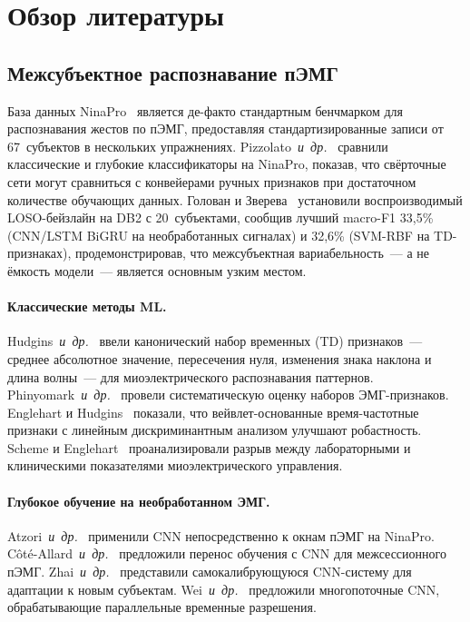 \documentclass[conference]{IEEEtran}
\newcommand{\etal}{\mbox{\textit{и~др.}}}
\begin{document}
\section{Обзор литературы}
\label{sec:related}

\subsection{Межсубъектное распознавание пЭМГ}

База данных NinaPro~\cite{atzori2014electromyography} является де-факто стандартным бенчмарком для распознавания жестов по пЭМГ, предоставляя стандартизированные записи от 67~субъектов в нескольких упражнениях.
Pizzolato~\etal~\cite{pizzolato2017comparison} сравнили классические и глубокие классификаторы на NinaPro, показав, что свёрточные сети могут сравниться с конвейерами ручных признаков при достаточном количестве обучающих данных.
Голован и Зверева~\cite{golovan2025benchmark} установили воспроизводимый LOSO-бейзлайн на DB2 с 20~субъектами, сообщив лучший macro-F1 33,5\% (CNN/LSTM BiGRU на необработанных сигналах) и 32,6\% (SVM-RBF на TD-признаках), продемонстрировав, что межсубъектная вариабельность~--- а не ёмкость модели~--- является основным узким местом.

\paragraph{Классические методы ML.}
Hudgins~\etal~\cite{hudgins1993new} ввели канонический набор временных (TD) признаков~--- среднее абсолютное значение, пересечения нуля, изменения знака наклона и длина волны~--- для миоэлектрического распознавания паттернов.
Phinyomark~\etal~\cite{phinyomark2012feature} провели систематическую оценку наборов ЭМГ-признаков.
Englehart и Hudgins~\cite{englehart2003robust} показали, что вейвлет-основанные время-частотные признаки с линейным дискриминантным анализом улучшают робастность.
Scheme и Englehart~\cite{scheme2011electromyogram} проанализировали разрыв между лабораторными и клиническими показателями миоэлектрического управления.

\paragraph{Глубокое обучение на необработанном ЭМГ.}
Atzori~\etal~\cite{atzori2016deep} применили CNN непосредственно к окнам пЭМГ на NinaPro.
C\^{o}t\'{e}-Allard~\etal~\cite{cote2019deep} предложили перенос обучения с CNN для межсессионного пЭМГ.
Zhai~\etal~\cite{zhai2017self} представили самокалибрующуюся CNN-систему для адаптации к новым субъектам.
Wei~\etal~\cite{wei2019multistream} предложили многопоточные CNN, обрабатывающие параллельные временные разрешения.
\end{document}
